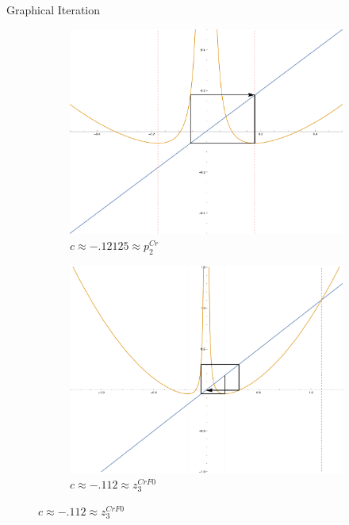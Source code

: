 \documentclass{beamer}
\newcommand{\<}{\left\langle}
\renewcommand{\>}{\right\rangle} %
\renewcommand{\*}{\cdot} %
\begin{document}
\begin{frame}[allowframebreaks]{Graphical Iteration}
\begin{figure}[ht]
		\centering

		\begin{subfigure}[b]{.49\textwidth}
				\includegraphics[width=\textwidth]{./img/plot-012125}
				\caption{$c \approx - .12125 \approx p_2^{Cr}$}
		\end{subfigure}
		\begin{subfigure}[b]{.49\textwidth}
				\includegraphics[width=\textwidth]{./img/plot-0112}
				\caption{$c \approx -.112 \approx z_3^{CrF0}$}
		\end{subfigure}


\end{figure}
\end{frame}
\end{document}

